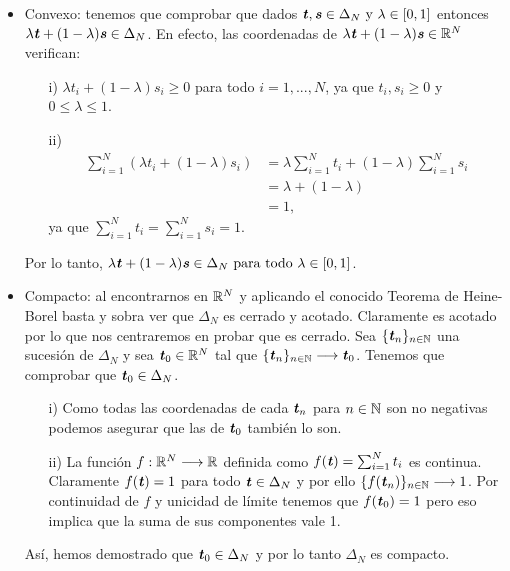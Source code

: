 	\begin{itemize}
		\item  Convexo: tenemos que comprobar que dados $ \textbf{\emph{t}}, \textbf{\emph{s}} \in \Delta_N \text{ y } \lambda \in \lbrack 0,1 \rbrack $ entonces $ \lambda\textbf{\emph{t}} + (1-\lambda)\textbf{\emph{s}} \in \Delta_N $. En efecto, las coordenadas de $ \lambda\textbf{\emph{t}} + (1-\lambda)\textbf{\emph{s}} \in \mathbb{R}^N $ verifican:
		\begin{itemize}
			\item [i) ] $ \lambda t_i + (1-\lambda)s_i \geq 0 $ para todo $ i = 1,..., N $, ya que $ t_i, s_i \geq 0 $ y $ 0 \leq \lambda \leq 1 $.
			\item [ii) ] 
			\begin{equation*}
			\begin{split}
			\sum_{i=1}^{N} (\lambda t_i + (1-\lambda)s_i) &=   \lambda \sum_{i=1}^{N} t_i + (1-\lambda)\sum_{i=1}^{N} s_i \\
			&= \lambda + (1 - \lambda) \\ &= 1,
			\end{split}
			\end{equation*}ya que $ \sum_{i=1}^{N} t_i = \sum_{i=1}^{N} s_i = 1  $.
		\end{itemize}
	
		Por lo tanto, $ \lambda\textbf{\emph{t}} + (1-\lambda)\textbf{\emph{s}} \in \Delta_N \text{ para todo }\lambda \in \lbrack 0,1 \rbrack $.
		
		\item Compacto: al encontrarnos en $ \mathbb{R}^N $ y aplicando el conocido Teorema de Heine-Borel basta y sobra ver que $ \Delta_N $ es cerrado y acotado. Claramente es acotado por lo que nos centraremos en probar que es cerrado. Sea $ \lbrace \textbf{\emph{t}}_n \rbrace_{ n \in \mathbb{N}} $ una sucesión de $ \Delta_N $ y sea $ \textbf{\emph{t}}_0 \in \mathbb{R}^N $ tal que $ \lbrace \textbf{\emph{t}}_n \rbrace_{ n \in \mathbb{N}} \longrightarrow \textbf{\emph{t}}_0 $. Tenemos que comprobar que $ \textbf{\emph{t}}_0 \in \Delta_N $. 
		\begin{itemize}
		\item[i) ] Como todas las coordenadas de cada $ \textbf{\emph{t}}_n $ para $ n \in \mathbb{N} $ son no negativas podemos asegurar que las de $ \textbf{\emph{t}}_0 $ también lo son.
		\item[ii) ] La función $ f: \mathbb{R}^N \longrightarrow \mathbb{R} $ definida como $ f(\textbf{\emph{t}}) =  \sum_{i=1}^{N} t_i $ es continua. Claramente $ f(\textbf{\emph{t}}) = 1 $ para todo $ \textbf{\emph{t}} \in \Delta_N $ y por ello $ \lbrace f(\textbf{\emph{t}}_n) \rbrace_{ n \in \mathbb{N}} \longrightarrow 1$. Por continuidad de $ f $ y unicidad de límite tenemos que $ f(\textbf{\emph{t}}_0) = 1 $ pero eso implica que la suma de sus componentes vale 1.
		\end{itemize} 
	
		Así, hemos demostrado que $ \textbf{\emph{t}}_0 \in \Delta_N $ y por lo tanto $ \Delta_N $ es compacto. 
	\end{itemize}

